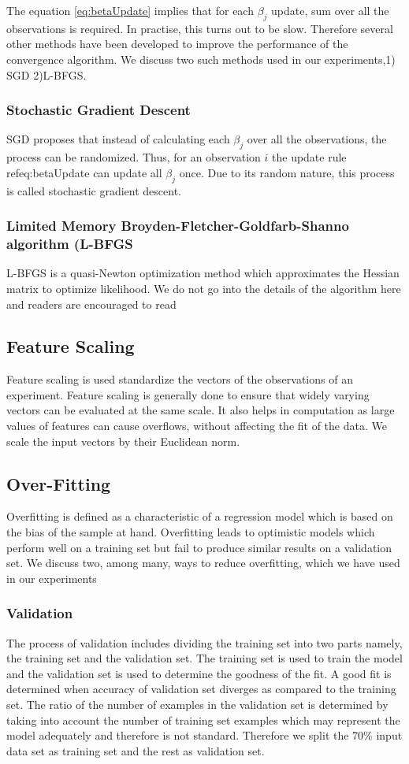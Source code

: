 \documentclass{acm_proc_article-sp}
\begin{document}
The equation \ref{eq:betaUpdate} implies that for each $\beta_j$ update, sum over all the observations is required. In practise, this turns out to be slow. Therefore several other methods have been developed to improve the performance of the convergence algorithm. We discuss two such methods used in our experiments,1) SGD 2)L-BFGS.
\\
\subsubsection*{Stochastic Gradient Descent}
SGD proposes that instead of calculating each $\beta_j$ over all the observations, the process can be randomized. Thus, for an observation $i$ the update rule \\ref{eq:betaUpdate} can update all $\beta_j$ once. Due to its random nature, this process is called stochastic gradient descent.
\subsubsection*{Limited Memory Broyden-Fletcher-Goldfarb-Shanno algorithm (L-BFGS}
L-BFGS is a quasi-Newton optimization method which approximates the Hessian matrix to optimize likelihood. We do not go into the details of the algorithm here and readers are encouraged to read \cite{malouf2002comparison}
\subsection{Feature Scaling}
Feature scaling is used standardize the vectors of the observations of an experiment. Feature scaling is generally done to ensure that widely varying vectors can be evaluated at the same scale\cite{bro2003centering}. It also helps in computation as large values of features can cause overflows, without affecting the fit of the data. We scale the input vectors by their Euclidean norm.
\subsection{Over-Fitting}
Overfitting is defined as a characteristic of a regression model which is based on the bias of the sample at hand\cite{babyak2004you}. Overfitting leads to optimistic models which perform well on a training set but fail to produce similar results on a validation set. We discuss two, among many, ways to reduce overfitting, which we have used in our experiments
\subsubsection*{Validation}
The process of validation includes dividing the training set into two parts namely, the training set and the validation set. The training set is used to train the model and the validation set is used to determine the goodness of the fit. A good fit is determined when accuracy of validation set diverges as compared to the training set. The ratio of the number of examples in the validation set is determined by taking into account the number of training set examples which may represent the model adequately and therefore is not standard. Therefore we split the 70\% input data set as training set and the rest as validation set.
\end{document}
